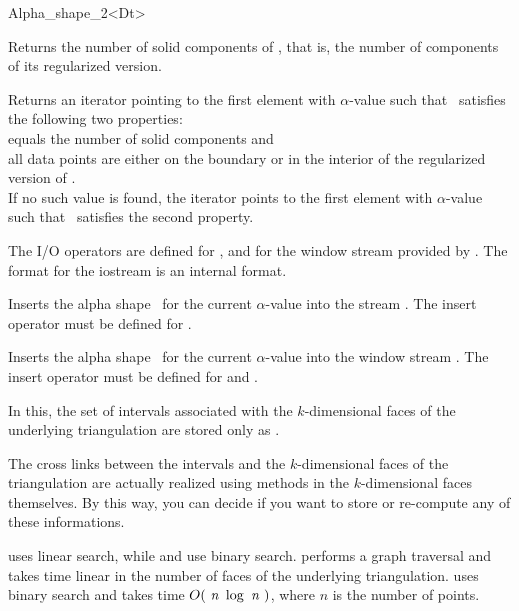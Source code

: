 \begin{ccRefClass} {Alpha_shape_2<Dt>}

{Returns the number of solid components of \ccVar, that is, the number of
components of its 
regularized version.}

{Returns an iterator pointing to the first element with $\alpha$-value
such that \ccVar\ satisfies the following two properties:\\
 equals the number of solid components and \\
all data points are either on the boundary or in the interior of the regularized version of \ccVar.\\
If no such value is found, the iterator points to the first element with 
$\alpha$-value such that \ccVar\ satisfies the second property.}


The I/O operators are defined for , and for
the window stream provided by \cgal. The format for the iostream
is an internal format. 


{Inserts the alpha shape \ccVar\ for the current $\alpha$-value into the stream .
\ccPrecond The insert operator must be defined for .}



{Inserts the alpha shape \ccVar\ for the current $\alpha$-value into the window stream .
\ccPrecond The insert operator must be defined for  and .}

\ccImplementation
In this, the set of intervals associated with the
$k$-dimensional faces of the underlying triangulation are
stored only as .

The cross links between the intervals and the $k$-dimensional faces of the
triangulation are actually realized using methods in the $k$-dimensional faces
themselves. By this way, you can decide if you want to store or re-compute any
of these informations.


 uses linear search, while 
 and  
use binary search.
 performs a graph traversal and takes time
linear in the number of faces of the underlying triangulation.
 uses binary search and takes time
$O(\mbox{ \em n } \log{\mbox{ \em n } })$, where  $n$ is the number of points.

\end{ccRefClass}

